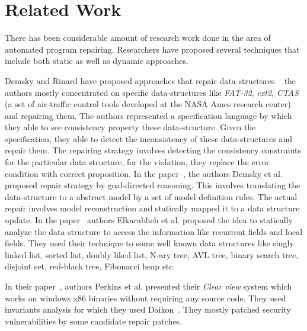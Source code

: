 \section{Related Work}
\label{sec:relatedWork}

There has been considerable amount of research work done in the area of 
automated program repairing. Researchers have proposed several techniques that
include both static as well as dynamic approaches.

% 
Demsky and Rinard have proposed approaches that repair data structures ~\cite{
Demsky03automaticdata, conf/issre/DemskyR03,conf/oopsla/DemskyR03,
conf/issta/DemskyEGMPR06} the authors mostly concentrated on specific data-structures like \emph{FAT-32}, \emph{ext2},
\emph{CTAS} (a set of air-traffic control tools developed at the NASA Ames
research center) and repairing them. The authors represented a specification
language by which they able to see consistency property these data-structure.
Given the specification, they able to detect the inconsistency of these
data-structures and repair them.
The repairing strategy involves detecting the consistency constraints for the
particular data structure, for the violation, they replace the error condition
with correct proposition. In the paper~\cite{conf/icse/DemskyR05}, the authors
Demsky et al. proposed repair strategy by goal-directed reasoning. This involves
translating the data-structure to a abstract model by a set of model definition
rules. The actual repair involves model reconstruction and statically mapped it
to a data structure update. In the paper~\cite{conf/oopsla/2007} authors
Elkarablieh et al. proposed the idea to statically analyze the data structure to
access the information like recurrent fields and local fields. They used their
technique to some well known data structures like singly linked list, sorted
list, doubly liked list, N-ary tree, AVL tree, binary search tree, disjoint set,
red-black tree, Fibonacci heap etc.

% 
In their paper~\cite{conf/sosp/PerkinsKLABCPSSSWZER09}, authors Perkins et al.
presented their \emph{Clear view} system which works on windows x86 binaries
without requiring any source code. They used invariants analysis for which
they used Daikon~\cite{DBLP:journals/scp/ErnstPGMPTX07}. They mostly patched
security vulnerabilities by some candidate repair patches.


